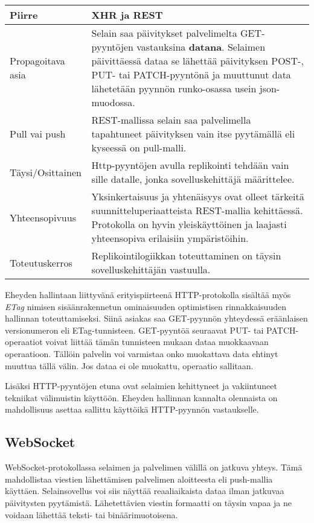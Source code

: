 \documentclass[finnish,twoside,censored,csm,sw-track-2018]{HYthesisML}
\begin{document}
\begin{center}
\begin{tabular}{ | m{3.3cm} | m{11.7cm} | }
 \hline
 \textbf{Piirre} & \textbf{XHR ja REST}\\ 
 \hline
 Propagoitava asia & Selain saa päivitykset palvelimelta GET-pyyntöjen vastauksina \textbf{datana}. Selaimen päivittäessä dataa se lähettää päivityksen POST-, PUT- tai PATCH-pyyntönä ja muuttunut data lähetetään pyynnön runko-osassa usein json-muodossa. \\
 \hline
 Pull vai push & REST-mallissa selain saa palvelimella tapahtuneet päivityksen vain itse pyytämällä eli kyseessä on pull-malli.\\
 \hline
 Täysi/Osittainen & Http-pyyntöjen avulla replikointi tehdään vain sille datalle, jonka sovelluskehittäjä määrittelee. \\
 \hline
 Yhteensopivuus & Yksinkertaisuus ja yhtenäisyys ovat olleet tärkeitä suunnitteluperiaatteista REST-mallia kehittäessä. Protokolla on hyvin yleiskäyttöinen ja laajasti yhteensopiva erilaisiin ympäristöihin.\\
 \hline
 Toteutuskerros & Replikointilogiikkan toteuttaminen on täysin sovelluskehittäjän vastuulla. \\
 \hline
\end{tabular}
\label{table-xhr}
\end{center}

Eheyden hallintaan liittyvänä erityispiirteenä HTTP-protokolla sisältää myös \textit{ETag} nimisen sisäänrakennetun ominaisuuden optimistisen rinnakkaisuuden hallinnan toteuttamiseksi. Siinä asiakas saa GET-pyynnön yhteydessä eräänlaisen versionumeron eli ETag-tunnisteen. GET-pyyntöä seuraavat PUT- tai PATCH-operaatiot voivat liittää tämän tunnisteen mukaan dataa muokkaavaan operaatioon. Tällöin palvelin voi varmistaa onko muokattava data ehtinyt muuttua tällä välin. Jos dataa ei ole muokattu, operaatio sallitaan. 

Lisäksi HTTP-pyyntöjen etuna ovat selaimien kehittyneet ja vakiintuneet tekniikat välimuistin käyttöön. Eheyden hallinnan kannalta olennaista on mahdollisuus asettaa sallittu käyttöikä HTTP-pyynnön vastaukselle.

\subsection{WebSocket}

WebSocket-protokollassa \citep{websocket-rfc} selaimen ja palvelimen välillä on jatkuva yhteys. Tämä mahdollistaa viestien lähettämisen palvelimen aloitteesta eli push-mallia käyttäen. Selainsovellus voi siis näyttää reaaliaikaista dataa ilman jatkuvaa päivitysten pyytämistä. Lähetettävien viestin formaatti on täysin vapaa ja ne voidaan lähettää teksti- tai binäärimuotoisena.
\end{document}
